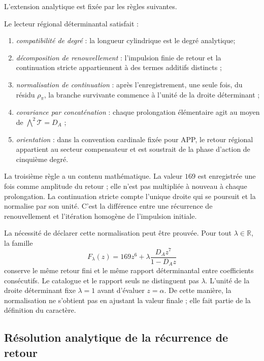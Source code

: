 L'extension analytique est fixée par les règles suivantes.

\begin{definition}
\label{p3-83-c30-s1:def:lector-regional-determinantal}
Le lecteur régional déterminantal satisfait :
\begin{enumerate}
  \item \emph{compatibilité de degré} : la longueur cylindrique est le degré
  analytique;
  \item \emph{décomposition de renouvellement} : l'impulsion finie de retour et
  la continuation stricte appartiennent à des termes additifs distincts ;
  \item \emph{normalisation de continuation} : après l'enregistrement, une seule
  fois, du résidu \(\rho_\pi\), la branche survivante commence à l'unité de
  la droite déterminant ;
  \item \emph{covariance par concaténation} : chaque prolongation élémentaire
  agit au moyen de
  \(\bigwedge^2\mathcal T=D_A\) ;
  \item \emph{orientation} : dans la convention cardinale fixée pour APP, le retour régional appartient au secteur compensateur et est soustrait de la phase d'action de cinquième degré.
\end{enumerate}
\end{definition}

La troisième règle a un contenu mathématique. La valeur \(169\) est enregistrée
une fois comme amplitude du retour ; elle n'est pas multipliée à nouveau à chaque
prolongation. La continuation stricte compte l'unique droite qui se poursuit et
la normalise par son unité. C'est la différence entre une récurrence de
renouvellement et l'itération homogène de l'impulsion initiale.

La nécessité de déclarer cette normalisation peut être prouvée. Pour tout
\(\lambda\in\mathbb R\), la famille
\[
F_\lambda(z)
=169z^6+\lambda\frac{D_Az^7}{1-D_Az}
\]
conserve le même retour fini et le même rapport déterminantal entre
coefficients consécutifs. Le catalogue et le rapport seuls ne distinguent pas
\(\lambda\). L'unité de la droite déterminant fixe
\(\lambda=1\) avant d'évaluer \(z=\alpha\). De cette manière, la normalisation
ne s'obtient pas en ajustant la valeur finale ; elle fait partie de la définition du
caractère.

\subsection{Résolution analytique de la récurrence de retour}
\label{sec:s102:c38:2:4}

